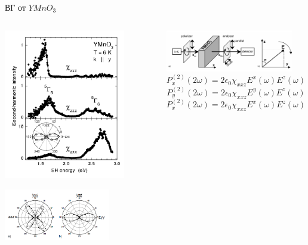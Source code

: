 \documentclass[9pt, compress, xcolor=table]{beamer}
\begin{document}
\begin{frame}{ВГ от $Y Mn O_3$}

\begin{columns}
\column{6.5cm}
\begin{center}
\includegraphics[width=0.8\textwidth]{shg13}

\includegraphics[width=0.7\textwidth]{shg15}
\end{center}
\column{6.5cm}
\begin{center}
\includegraphics[width=0.9\textwidth]{shg14}
\begin{equation*}
P_x^{(2)}(2\omega) = 2\epsilon_0\chi_{xxz}E^x(\omega)E^z(\omega)
\end{equation*}
\begin{equation*}
P_y^{(2)}(2\omega) = 2\epsilon_0\chi_{xxz}E^y(\omega)E^z(\omega)
\end{equation*}
\begin{equation*}
P_x^{(2)}(2\omega) = 2\epsilon_0\chi_{xxz}E^x(\omega)E^z(\omega)
\end{equation*}


\end{center}
\end{columns}
\end{frame}
\end{document}
